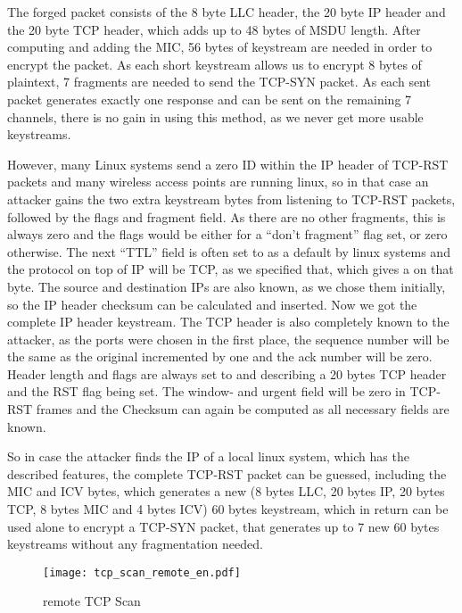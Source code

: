 \documentclass[a4paper,10pt]{scrartcl}
\begin{document}
The forged packet consists of the 8 byte LLC header, the 20 byte IP header and the 20 byte TCP header, which adds up to 48 bytes of
MSDU length. After computing and adding the MIC, 56 bytes of keystream are needed in order to encrypt the packet. As each short
keystream allows us to encrypt 8 bytes of plaintext, 7 fragments are needed to send the TCP-SYN packet. As each sent packet generates
exactly one response and can be sent on the remaining 7 channels, there is no gain in using this method, as we never get more usable
keystreams.

However, many Linux systems send a zero ID within the IP header of TCP-RST packets and many wireless access points are
running linux, so in that case an attacker gains the two extra keystream bytes from listening to TCP-RST packets, followed by the flags
and fragment field. As there are no other fragments, this is always zero and the flags would be either  for a ``don't fragment''
flag set, or zero otherwise. The next ``TTL'' field is often set to  as a default by linux systems and the protocol on top of IP
will be TCP, as we specified that, which gives a  on that byte. The source and destination IPs are also known, as we chose them
initially, so the IP header checksum can be calculated and inserted. Now we got the complete IP header keystream. The TCP header is also
completely known to the attacker, as the ports were chosen in the first place, the sequence number will be the same as the original
incremented by one and the ack number will be zero. Header length and flags are always set to  and  describing a 20 bytes
TCP header and the RST flag being set. The window- and urgent field will be zero in TCP-RST frames and the Checksum can again be
computed as all necessary fields are known.

So in case the attacker finds the IP of a local linux system, which has the described features, the complete TCP-RST packet can be
guessed, including the MIC and ICV bytes, which generates a new (8 bytes LLC, 20 bytes IP, 20 bytes TCP, 8 bytes MIC and 4 bytes ICV)
60 bytes keystream, which in return can be used alone to encrypt a TCP-SYN packet, that generates up to 7 new 60 bytes keystreams
without any fragmentation needed.

\begin{figure}[htbp]
  \centering
    \texttt{[image: tcp\_scan\_remote\_en.pdf]}
  \caption{remote TCP Scan}
  \label{figure:tcp_scan_remote}
\end{figure}
\end{document}
